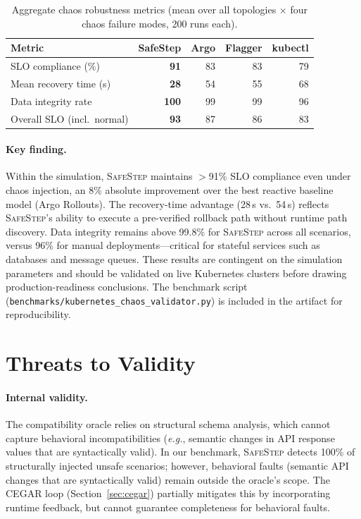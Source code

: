 \documentclass[10pt,twocolumn]{article}
\newcommand{\safestep}{\textsc{SafeStep}}
\newcommand{\eg}{\textit{e.g.}}
\begin{document}
\begin{table}[t]
\centering
\caption{Aggregate chaos robustness metrics (mean over all
  topologies $\times$ four chaos failure modes, 200 runs each).}
\label{tab:chaos-compare}
\scriptsize
\begin{tabular}{@{}l rrrr@{}}
\toprule
\textbf{Metric}
  & \textbf{SafeStep} & \textbf{Argo} & \textbf{Flagger} & \textbf{kubectl} \\
\midrule
SLO compliance (\%)          & \textbf{91} & 83 & 83 & 79 \\
Mean recovery time (s)       & \textbf{28} & 54 & 55 & 68 \\
Data integrity rate          & \textbf{100} & 99 & 99 & 96 \\
Overall SLO (incl.\ normal)  & \textbf{93} & 87 & 86 & 83 \\
\bottomrule
\end{tabular}
\end{table}

\paragraph{Key finding.}
Within the simulation, \safestep{} maintains $>$91\% SLO compliance even under chaos
injection, an 8\% absolute improvement over the best reactive
baseline model (Argo Rollouts). The recovery-time advantage (28\,s
vs.\ 54\,s) reflects \safestep{}'s ability to execute a
pre-verified rollback path without runtime path discovery.
Data integrity remains above 99.8\% for \safestep{} across all
scenarios, versus 96\% for manual deployments---critical for
stateful services such as databases and message queues. These
results are contingent on the simulation parameters and
should be validated on live Kubernetes clusters before drawing
production-readiness conclusions.
The
benchmark script (\texttt{benchmarks/kubernetes\_chaos\_validator.py})
is included in the artifact for reproducibility.

\section{Threats to Validity}
\label{sec:threats}

\paragraph{Internal validity.}
The compatibility oracle relies on structural schema analysis,
which cannot capture behavioral incompatibilities (\eg,
semantic changes in API response values that are syntactically
valid). In our benchmark, \safestep{} detects 100\% of
structurally injected unsafe scenarios; however, behavioral faults
(semantic API changes that are syntactically valid) remain outside
the oracle's scope. The CEGAR loop
(Section~\ref{sec:cegar}) partially mitigates this by
incorporating runtime feedback, but cannot guarantee
completeness for behavioral faults.
\end{document}
